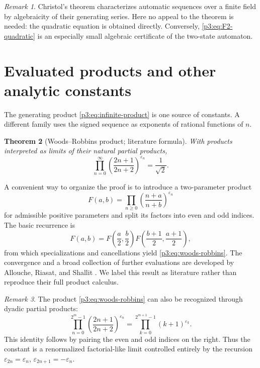 \documentclass[11pt,oneside]{article}
\newtheorem{theorem}{Theorem}[section]
\theoremstyle{definition}
\theoremstyle{remark}
\newtheorem{remark}[theorem]{Remark}
\newcommand{\eps}{\varepsilon}
\newcommand{\1}{\mathbf 1}
\begin{document}
\begin{remark}
Christol's theorem characterizes automatic sequences over a finite field by algebraicity of
their generating series.  Here no appeal to the theorem is needed: the quadratic equation is
obtained directly.  Conversely, \eqref{p3:eq:F2-quadratic} is an especially small algebraic
certificate of the two-state automaton.
\end{remark}

\section{Evaluated products and other analytic constants}
\label{p3:sec:constants}

The generating product \eqref{p3:eq:infinite-product} is one source of constants.  A different
family uses the signed sequence as exponents of rational functions of \(n\).

\begin{theorem}[Woods--Robbins product; literature formula]
\label{p3:thm:woods-robbins}
With products interpreted as limits of their natural partial products,
\begin{equation}
 \boxed{
 \prod_{n=0}^{\infty}
 \left(\frac{2n+1}{2n+2}\right)^{\eps_n}
 =\frac1{\sqrt2}.}
 \label{p3:eq:woods-robbins}
\end{equation}
\end{theorem}

A convenient way to organize the proof is to introduce a two-parameter product
\[
 F(a,b)=\prod_{n\ge0}\left(\frac{n+a}{n+b}\right)^{\eps_n}
\]
for admissible positive parameters and split its factors into even and odd indices.  The basic
recurrence is
\begin{equation}
 F(a,b)=F\!\left(\frac a2,\frac b2\right)
        F\!\left(\frac{b+1}{2},\frac{a+1}{2}\right),
 \label{p3:eq:F-functional-product}
\end{equation}
from which specializations and cancellations yield \eqref{p3:eq:woods-robbins}.  The convergence
and a broad collection of further evaluations are developed by Allouche, Riasat, and Shallit
\cite{p3:alloucheriasatshallit2019}.  We label this result as literature rather than reproduce
their full product calculus.

\begin{remark}
The product \eqref{p3:eq:woods-robbins} can also be recognized through dyadic partial products:
\[
 \prod_{n=0}^{2^m-1}\left(\frac{2n+1}{2n+2}\right)^{\eps_n}
 =\prod_{k=0}^{2^{m+1}-1}(k+1)^{\eps_k}.
\]
This identity follows by pairing the even and odd indices on the right.  Thus the constant is
a renormalized factorial-like limit controlled entirely by the recursion
\(\eps_{2n}=\eps_n\), \(\eps_{2n+1}=-\eps_n\).
\end{remark}
\end{document}
